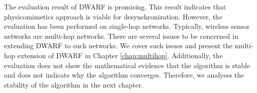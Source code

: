 The evaluation result of DWARF is promising. This result indicates that physicomimetics approach is viable for desynchronization. However, the evaluation has been performed on single-hop networks. Typically, wireless sensor networks are multi-hop networks. There are several issues to be concerned in extending DWARF to such networks. We cover such issues and present the multi-hop extension of DWARF in Chapter \ref{chap:multihop}.
Additionally, the evaluation does not show the mathematical evidence that the algorithm is stable and does not indicate why the algorithm converges. Therefore, we analyses the stability of the algorithm in the next chapter.



